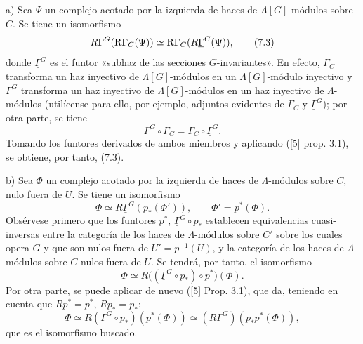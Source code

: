 a) Sea $\Psi$ un complejo acotado por la izquierda de haces de $\Lambda[G]$-módulos sobre $C$. Se tiene un isomorfismo
\[
R\Gamma^G(\mathrm R\Gamma_C(\Psi))\simeq\mathrm R\Gamma_C(R\underline{\Gamma}^G(\Psi)),
\tag{7.3}
\]
donde $\underline{\Gamma}^G$ es el funtor «subhaz de las secciones $G$-invariantes». En efecto, $\Gamma_C$ transforma un haz inyectivo de $\Lambda[G]$-módulos en un $\Lambda[G]$-módulo inyectivo y $\underline{\Gamma}^G$ transforma un haz inyectivo de $\Lambda[G]$-módulos en un haz inyectivo de $\Lambda$-módulos (utilícense para ello, por ejemplo, adjuntos evidentes de $\Gamma_C$ y $\underline{\Gamma}^G$); por otra parte, se tiene
\[
\Gamma^G\circ\Gamma_C=\Gamma_C\circ\underline{\Gamma}^G.
\]
Tomando los funtores derivados de ambos miembros y aplicando ([5] prop. 3.1), se obtiene, por tanto, (7.3).

b) Sea $\Phi$ un complejo acotado por la izquierda de haces de $\Lambda$-módulos sobre $C$, nulo fuera de $U$. Se tiene un isomorfismo
\[
\Phi\simeq R\underline{\Gamma}^G(p_*(\Phi')),
\qquad \Phi'=p^*(\Phi).
\tag{7.4}
\]
Obsérvese primero que los funtores $p^*$, $\underline{\Gamma}^G\circ p_*$ establecen equivalencias cuasi-inversas entre la categoría de los haces de $\Lambda$-módulos sobre $C'$ sobre los cuales opera $G$ y que son nulos fuera de $U'=p^{-1}(U)$, y la categoría de los haces de $\Lambda$-módulos sobre $C$ nulos fuera de $U$. Se tendrá, por tanto, el isomorfismo
\[
\Phi\simeq R\bigl((\underline{\Gamma}^G\circ p_*)\circ p^*\bigr)(\Phi).
\]
Por otra parte, se puede aplicar de nuevo ([5] Prop. 3.1), que da, teniendo en cuenta que $Rp^*=p^*$, $Rp_*=p_*$:
\[
\Phi\simeq R(\underline{\Gamma}^G\circ p_*)(p^*(\Phi))
\simeq (R\underline{\Gamma}^G)(p_*p^*(\Phi)),
\]
que es el isomorfismo buscado.
